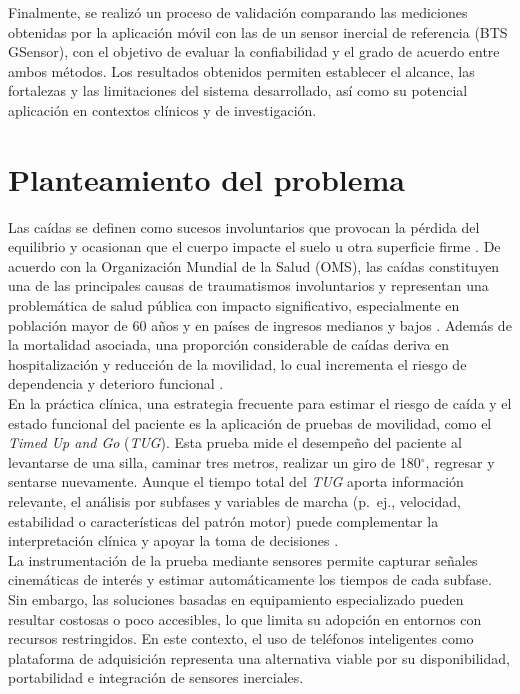 \documentclass[12pt]{report}
\begin{document}
\begin{justify}
    Finalmente, se realizó un proceso de validación comparando las mediciones obtenidas por la aplicación móvil con las de un sensor inercial de referencia (BTS GSensor), con el objetivo de evaluar la confiabilidad y el grado de acuerdo entre ambos métodos. Los resultados obtenidos permiten establecer el alcance, las fortalezas y las limitaciones del sistema desarrollado, así como su potencial aplicación en contextos clínicos y de investigación.\\







    \section{Planteamiento del problema}

    Las caídas se definen como sucesos involuntarios que provocan la pérdida del equilibrio y ocasionan que el cuerpo impacte el suelo u otra superficie firme \cite{OMS-falls}. De acuerdo con la Organización Mundial de la Salud (OMS), las caídas constituyen una de las principales causas de traumatismos involuntarios y representan una problemática de salud pública con impacto significativo, especialmente en población mayor de 60 años y en países de ingresos medianos y bajos \cite{OMS-falls}. Además de la mortalidad asociada, una proporción considerable de caídas deriva en hospitalización y reducción de la movilidad, lo cual incrementa el riesgo de dependencia y deterioro funcional \cite{OMS-falls}.\\

    En la práctica clínica, una estrategia frecuente para estimar el riesgo de caída y el estado funcional del paciente es la aplicación de pruebas de movilidad, como el \textit{Timed Up and Go} (\textit{TUG}). Esta prueba mide el desempeño del paciente al levantarse de una silla, caminar tres metros, realizar un giro de 180$^\circ$, regresar y sentarse nuevamente. Aunque el tiempo total del \textit{TUG} aporta información relevante, el análisis por subfases y variables de marcha (p.\ ej., velocidad, estabilidad o características del patrón motor) puede complementar la interpretación clínica y apoyar la toma de decisiones \cite{fragilidad-indicador}.\\

    La instrumentación de la prueba mediante sensores permite capturar señales cinemáticas de interés y estimar automáticamente los tiempos de cada subfase. Sin embargo, las soluciones basadas en equipamiento especializado pueden resultar costosas o poco accesibles, lo que limita su adopción en entornos con recursos restringidos. En este contexto, el uso de teléfonos inteligentes como plataforma de adquisición representa una alternativa viable por su disponibilidad, portabilidad e integración de sensores inerciales.\\


\end{justify}
\end{document}
